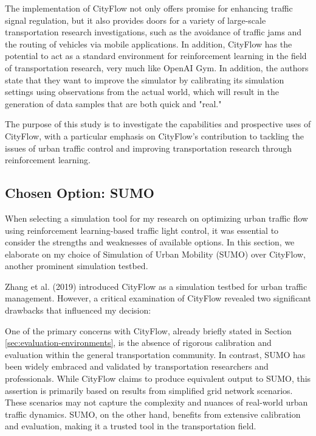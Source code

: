 The implementation of CityFlow not only offers promise for enhancing traffic signal regulation, but it also provides doors for a variety of large-scale transportation research investigations, such as the avoidance of traffic jams and the routing of vehicles via mobile applications. In addition, CityFlow has the potential to act as a standard environment for reinforcement learning in the field of transportation research, very much like OpenAI Gym. In addition, the authors state that they want to improve the simulator by calibrating its simulation settings using observations from the actual world, which will result in the generation of data samples that are both quick and "real."

The purpose of this study is to investigate the capabilities and prospective uses of CityFlow, with a particular emphasis on CityFlow's contribution to tackling the issues of urban traffic control and improving transportation research through reinforcement learning.

\subsection{Chosen Option: SUMO}
When selecting a simulation tool for my research on optimizing urban traffic flow using reinforcement learning-based traffic light control, it was essential to consider the strengths and weaknesses of available options. In this section, we elaborate on my choice of Simulation of Urban Mobility (SUMO) over CityFlow, another prominent simulation testbed.

Zhang et al. (2019)\cite{zhang2019cityflow} introduced CityFlow as a simulation testbed for urban traffic management. However, a critical examination of CityFlow revealed two significant drawbacks that influenced my decision:

One of the primary concerns with CityFlow, already briefly stated in Section \ref{sec:evaluation-environments}, is the absence of rigorous calibration and evaluation within the general transportation community. In contrast, SUMO has been widely embraced and validated by transportation researchers and professionals. While CityFlow claims to produce equivalent output to SUMO, this assertion is primarily based on results from simplified grid network scenarios. These scenarios may not capture the complexity and nuances of real-world urban traffic dynamics. SUMO, on the other hand, benefits from extensive calibration and evaluation, making it a trusted tool in the transportation field.


